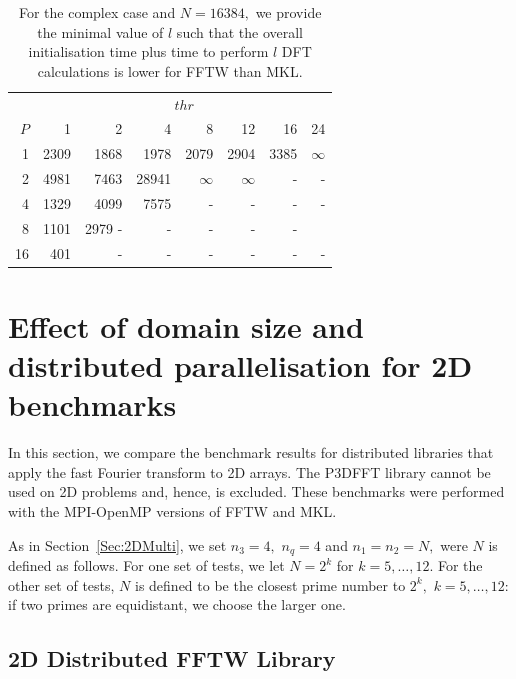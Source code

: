 \documentclass[a4paper]{article}
\begin{document}
\begin{table}
\begin{center}
\begin{tabular}{|r||r|r|r|r|r|r|r|}
  \hline
 & \multicolumn{7}{|c|}{$thr$} \\
$P$ & 1 & 2 & 4 & 8 & 12 & 16 & 24 \\ \hline
  1 &    2309 &   1868 &  1978 &  2079 &  2904 &  3385 & $\infty$   \\
  2 &     4981 &  7463 &  28941 & $\infty$ &  $\infty$ &           - &           - \\
  4 &     1329 &  4099 &   7575 &           - &          - &          - &          - \\
  8 &    1101 &   2979           - &          - &          - &          - &          - \\
  16 &    401 &          - &          - &          - &          - &          - &          - \\ \hline
\end{tabular}
\caption{ For the complex case and $N=16384,$ we provide the minimal value of $l$ such that the overall initialisation time plus time to perform $l$ DFT calculations is lower for FFTW than MKL.  }\label{Tbl:1Dl}
\end{center}
\end{table}

\clearpage

\section{Effect of domain size and distributed parallelisation for 2D benchmarks}\label{Sec:2DDistr}


In this section, we compare the benchmark results for distributed
libraries that apply the fast Fourier transform to 2D arrays.  The
P3DFFT library cannot be used on 2D problems and, hence, is
excluded. These benchmarks were performed with the MPI-OpenMP versions
of FFTW and MKL. 

As in Section~\ref{Sec:2DMulti}, we set $n_3=4,$ $n_q=4$ and $n_1=n_2=N,$ were $N$ is
defined as follows.  For one set of tests, we let $N=2^k$ for
$k=5,\ldots,12.$ For the other set of tests, $N$ is defined to be the
closest prime number to $2^k,$ $k=5,\ldots,12:$ if two primes are
equidistant, we choose the larger one.

\subsection{2D Distributed FFTW Library}\label{Sec:2DDistFFTW}
\end{document}
